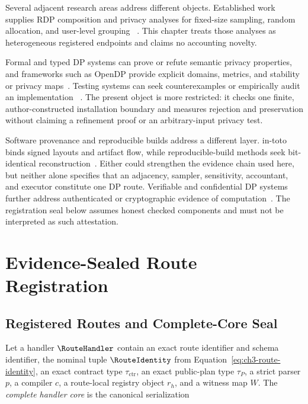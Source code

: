 Several adjacent research areas address different objects.  Established work
supplies RDP composition and privacy analyses for fixed-size sampling, random
allocation, and user-level grouping
~\cite{mironov2017renyi,wang2019subsampled,birrell2024fixed,
shenfeld2025randomallocation,chua2024mind}.  This chapter treats those analyses as
heterogeneous registered endpoints and claims no accounting novelty.

Formal and typed DP systems can prove or refute semantic privacy properties, and
frameworks such as OpenDP provide explicit domains, metrics, and stability or
privacy maps~\cite{near2019duet,wang2020checkdp,hay2020opendp}.  Testing systems can
seek counterexamples or empirically audit an implementation
~\cite{kong2024auditorium,chua2024implementations}.  The present object is more
restricted: it checks one finite, author-constructed installation boundary and
measures rejection and preservation without claiming a refinement proof or an
arbitrary-input privacy test.

Software provenance and reproducible builds address a different layer.  in-toto
binds signed layouts and artifact flow, while reproducible-build methods seek
bit-identical reconstruction~\cite{torresarias2019intoto,lamb2022reproducible}.
Either could strengthen the evidence chain used here, but neither alone specifies
that an adjacency, sampler, sensitivity, accountant, and executor constitute one
DP route.  Verifiable and confidential DP systems further address authenticated or
cryptographic evidence of computation~\cite{narayan2015verifiable,
shamsabadi2024confidential}.  The registration seal below assumes honest checked
components and must not be interpreted as such attestation.

\section{Evidence-Sealed Route Registration}
\label{sec:ch3-registration}

\subsection{Registered Routes and Complete-Core Seal}
\label{subsec:ch3-complete-core}

Let a handler \(\RouteHandler\) contain an exact route identifier and schema
identifier, the nominal tuple \(\RouteIdentity\) from
Equation~\eqref{eq:ch3-route-identity}, an exact contract type
\(\tau_{\mathrm{ctr}}\), an exact public-plan type \(\tau_P\), a strict parser
\(p\), a compiler \(c\), a route-local registry object \(r_h\), and a witness map
\(W\).  The \emph{complete handler core} is the canonical serialization

